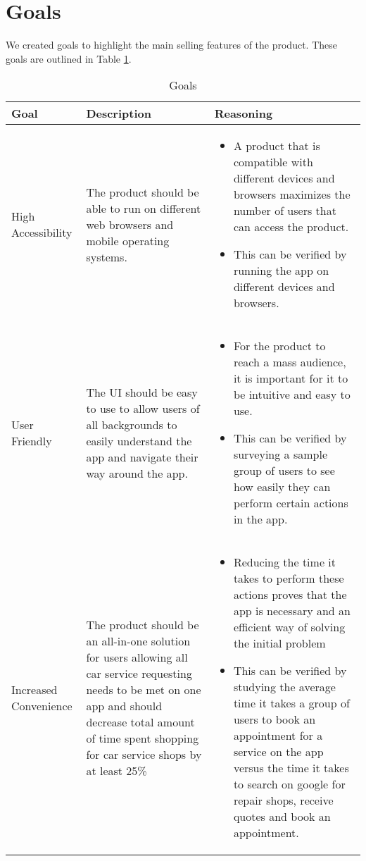 \documentclass{article}
\begin{document}
\section{Goals}

We created goals to highlight the main selling features of the product. These goals are outlined in Table \ref{tab:goals}.
\renewcommand{\arraystretch}{1.8}%
\begin{center}
    \begin{longtable}{ | p{3cm} | p{4cm} | p{4.5cm} |}
    \caption{Goals}
    \label{tab:goals}
    \\ \hline
    \textbf{Goal} & \textbf{Description} & \textbf{Reasoning} \\ \hline
    High Accessibility & 
    The product should be able to run on different web browsers and mobile operating systems. &  
    \begin{itemize}[noitemsep,nolistsep,leftmargin=*]
        \item A product that is compatible with different devices and browsers maximizes the number of users that can access the product.
        \item This can be verified by running the app on different devices and browsers.
    \end{itemize}
\\ \hline

    User Friendly & 
    The UI should be easy to use to allow users of all backgrounds to easily understand the app and navigate their way around the app.  &  
    \begin{itemize}[noitemsep,nolistsep,leftmargin=*]
        \item For the product to reach a mass audience, it is important for it to be intuitive and easy to use.
        \item This can be verified by surveying a sample group of users to see how easily they can perform certain actions in the app.
    \end{itemize}
\\ \hline

Increased Convenience & 
    The product should be an all-in-one solution for users allowing all car service requesting needs to be met on one app and should decrease total amount of time spent shopping for car service shops by at least 25\% &  
    \begin{itemize}[noitemsep,nolistsep,leftmargin=*]
        \item Reducing the time it takes to perform these actions proves that the app is necessary and an efficient way of solving the initial problem
        \item This can be verified by studying the average time it takes a group of users to book an appointment for a service on the app versus the time it takes to search on google for repair shops, receive quotes and book an appointment.
    \end{itemize}
\\ \hline


\end{longtable}
\end{center}
\end{document}

